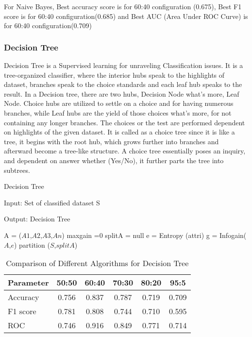 \documentclass{article}
\begin{document}
For Naive Bayes,
Best accuracy score is for 60:40 configuration (0.675),
Best F1 score is for 60:40 configuration(0.685) and
Best AUC (Area Under ROC Curve) is for 60:40 configuration(0.709)


\newpage
 \subsubsection{Decision Tree}
Decision Tree is a Supervised learning for unraveling Classification issues. It is a tree-organized classifier, where the interior hubs speak to the highlights of dataset, branches speak to the choice standards and each leaf hub speaks to the result. In a Decision tree, there are two hubs, Decision Node what's more, Leaf Node. Choice hubs are utilized to settle on a choice and for 
having numerous branches, while Leaf hubs are the yield of those choices what's more, for not containing any longer branches. The choices or the test are
performed dependent on highlights of the given dataset. It is called as a choice tree since it is like a tree, it begins with the root hub, which grows further into branches and afterward become a tree-like structure. A choice tree essentially poses an inquiry, and dependent on answer whether (Yes/No), it further parts the tree into subtrees.
\begin{algorithm}[!h] %
\caption{Decision Tree} %
\label{algo1}
Input: Set of classified dataset S


Output: Decision Tree

\begin{algorithmic}[1]

\State A = {($A1$,$A2$,$A3$,$An$)}
\State maxgain =0
\State splitA = null
\State e = Entropy {(attri)} 
\State g = Infogain{($A$,$e$)} 
\EndFor
\State partition {($S$,$splitA$)} 


\EndProcedure
\end{algorithmic}
\end{algorithm}

\begin{table}[!h]
\centering
\begin{tabular}{|l|c|c|c|c|c|}
\hline
\textbf{Parameter} &  \textbf{50:50} &  \textbf{60:40} &  \textbf{70:30} &  \textbf{80:20} &  \textbf{95:5} \\
\hline
Accuracy & 0.756 & 0.837 & 0.787 & 0.719 & 0.709 \\
\hline
F1 score & 0.781 & 0.808 & 0.744 & 0.710 & 0.595\\
\hline
ROC & 0.746 & 0.916 & 0.849 & 0.771 & 0.714\\
\hline


\end{tabular}
\caption{Comparison of Different Algorithms for Decision Tree}
\label{tbl:dataset}
\end{table}
\bigskip
\end{document}
